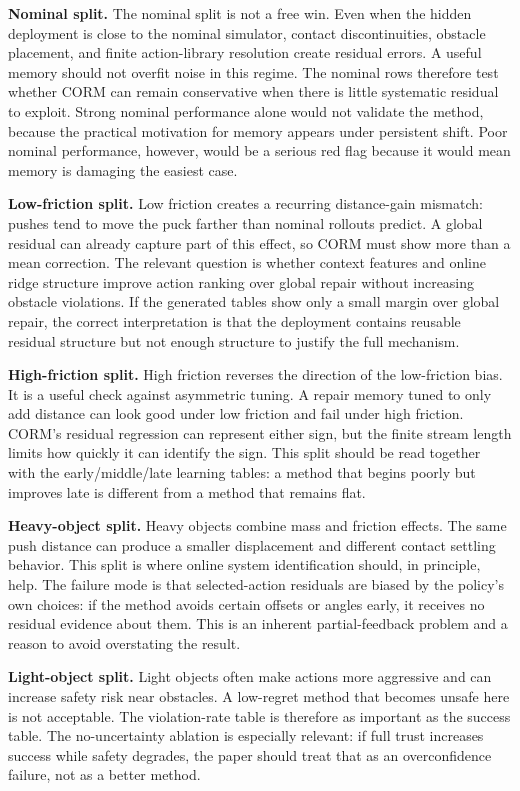 \documentclass{article}
\begin{document}
\textbf{Nominal split.} The nominal split is not a free win. Even when the hidden deployment is close to the nominal simulator, contact discontinuities, obstacle placement, and finite action-library resolution create residual errors. A useful memory should not overfit noise in this regime. The nominal rows therefore test whether CORM can remain conservative when there is little systematic residual to exploit. Strong nominal performance alone would not validate the method, because the practical motivation for memory appears under persistent shift. Poor nominal performance, however, would be a serious red flag because it would mean memory is damaging the easiest case.

\textbf{Low-friction split.} Low friction creates a recurring distance-gain mismatch: pushes tend to move the puck farther than nominal rollouts predict. A global residual can already capture part of this effect, so CORM must show more than a mean correction. The relevant question is whether context features and online ridge structure improve action ranking over global repair without increasing obstacle violations. If the generated tables show only a small margin over global repair, the correct interpretation is that the deployment contains reusable residual structure but not enough structure to justify the full mechanism.

\textbf{High-friction split.} High friction reverses the direction of the low-friction bias. It is a useful check against asymmetric tuning. A repair memory tuned to only add distance can look good under low friction and fail under high friction. CORM's residual regression can represent either sign, but the finite stream length limits how quickly it can identify the sign. This split should be read together with the early/middle/late learning tables: a method that begins poorly but improves late is different from a method that remains flat.

\textbf{Heavy-object split.} Heavy objects combine mass and friction effects. The same push distance can produce a smaller displacement and different contact settling behavior. This split is where online system identification should, in principle, help. The failure mode is that selected-action residuals are biased by the policy's own choices: if the method avoids certain offsets or angles early, it receives no residual evidence about them. This is an inherent partial-feedback problem and a reason to avoid overstating the result.

\textbf{Light-object split.} Light objects often make actions more aggressive and can increase safety risk near obstacles. A low-regret method that becomes unsafe here is not acceptable. The violation-rate table is therefore as important as the success table. The no-uncertainty ablation is especially relevant: if full trust increases success while safety degrades, the paper should treat that as an overconfidence failure, not as a better method.
\end{document}
